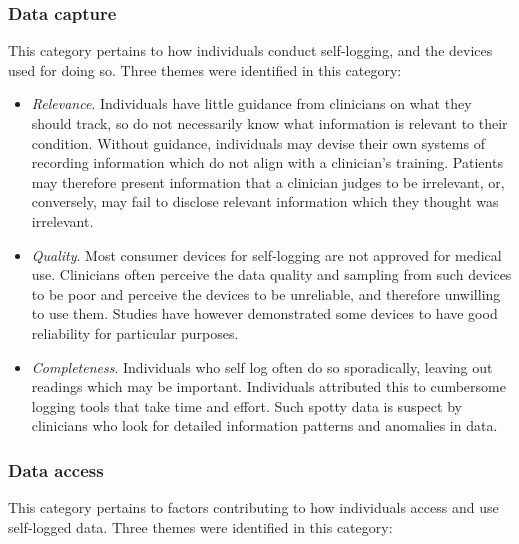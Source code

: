 \documentclass{sigchi}
\begin{document}
\subsubsection{Data capture}

This category pertains to how individuals conduct self-logging, and the devices used for doing so. Three themes were identified in this category:

\begin{itemize}
    \item \textit{Relevance}. Individuals have little guidance from clinicians on what they should track, so do not necessarily know what information is relevant to their condition. Without guidance, individuals may devise their own systems of recording information which do  not align with a clinician's training. Patients may therefore present information that a clinician judges to be irrelevant, or, conversely, may fail to disclose relevant information which they thought was irrelevant. 
    
    \item \textit{Quality}. Most consumer devices for self-logging are not approved for medical use. Clinicians often perceive the data quality and sampling from such devices to be poor and perceive the devices to be unreliable, and therefore unwilling to use them. Studies have however demonstrated some devices to have good reliability for particular purposes.
    
    \item \textit{Completeness}. Individuals who self log often do so sporadically, leaving out readings which may be important. Individuals attributed this to cumbersome logging tools that take time and effort. Such spotty data is suspect by clinicians who look for detailed information patterns and anomalies in data.
\end{itemize}

\subsubsection{Data access}

This category pertains to factors contributing to how individuals access and use self-logged data. Three themes were identified in this category:
\end{document}
